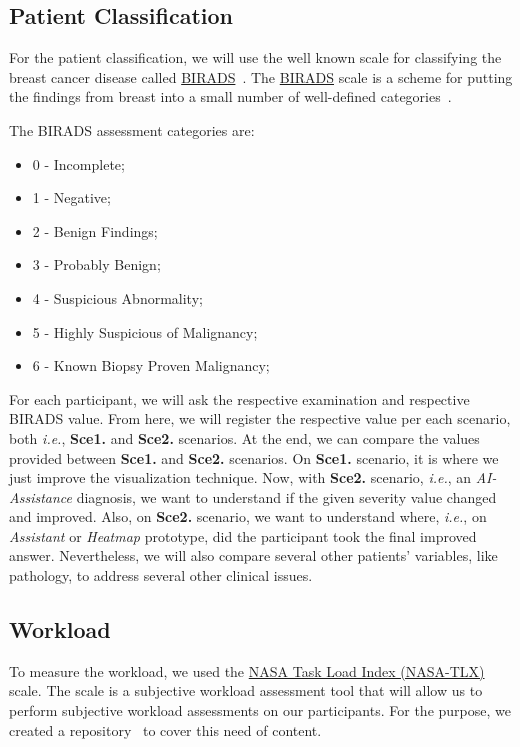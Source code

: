 \subsection{Patient Classification}

For the patient classification, we will use the well known scale for classifying the breast cancer disease called \hyperlink{https://en.wikipedia.org/wiki/BI-RADS}{BIRADS}~\cite{balleyguier2007birads}. The \hyperlink{https://en.wikipedia.org/wiki/BI-RADS}{BIRADS} scale is a scheme for putting the findings from breast into a small number of well-defined categories~\cite{obenauer2005applications}.

\hfil

The BIRADS assessment categories are:

\begin{itemize}
\item 0 - Incomplete;
\item 1 - Negative;
\item 2 - Benign Findings;
\item 3 - Probably Benign;
\item 4 - Suspicious Abnormality;
\item 5 - Highly Suspicious of Malignancy;
\item 6 - Known Biopsy Proven Malignancy;
\end{itemize}

For each participant, we will ask the respective examination and respective BIRADS value. From here, we will register the respective value per each scenario, both {\it i.e.}, {\bf Sce1.} and {\bf Sce2.} scenarios. At the end, we can compare the values provided between {\bf Sce1.} and {\bf Sce2.} scenarios. On {\bf Sce1.} scenario, it is where we just improve the visualization technique. Now, with {\bf Sce2.} scenario, {\it i.e.}, an {\it AI-Assistance} diagnosis, we want to understand if the given severity value changed and improved. Also, on {\bf Sce2.} scenario, we want to understand where, {\it i.e.}, on {\it Assistant} or {\it Heatmap} prototype, did the participant took the final improved answer. Nevertheless, we will also compare several other patients' variables, like pathology, to address several other clinical issues.

\subsection{Workload}

To measure the workload, we used the \hyperlink{https://en.wikipedia.org/wiki/NASA-TLX}{NASA Task Load Index (NASA-TLX)}~\cite{ramkumar2017using} scale. The scale is a subjective workload assessment tool that will allow us to perform subjective workload assessments on our participants. For the purpose, we created a repository~\cite{https://doi.org/10.13140/rg.2.2.25301.06883, francisco_maria_calisto_2018_1435044} to cover this need of content.

